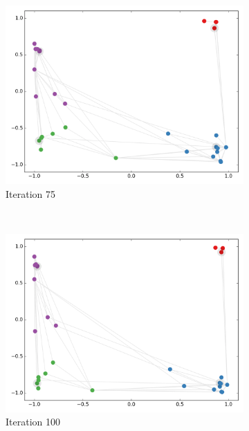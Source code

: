 \documentclass{article} %
\begin{document}
\begin{figure}[htbp]
\begin{subfigure}[b]{0.5\textwidth}
    \centering
    \includegraphics[width=\textwidth, trim={0 1.5cm 0 0}, clip]{anim_lines-75.png}
    \caption{Iteration 75}
    \label{fig:semi-emb-c}
\end{subfigure}%
~
\begin{subfigure}[b]{0.5\textwidth}
    \centering
    \includegraphics[width=\textwidth, trim={0 1.5cm 0 0}, clip]{anim_lines-100.png}
    \caption{Iteration 100}
    \label{fig:semi-emb-d}
\end{subfigure}%
\vspace{0.5em}
\begin{subfigure}[b]{0.5\textwidth}
    \centering

\end{subfigure}
\end{figure}
\end{document}

